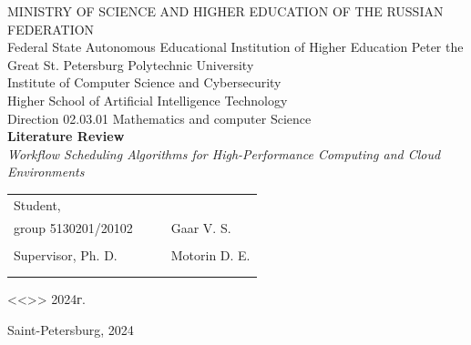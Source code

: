 \documentclass[a4paper, final]{article}
\begin{document}
\setcounter{tocdepth}{2} %
\begin{center}
    \hfill \break
    \hfill \break
    \normalsize{MINISTRY OF SCIENCE AND HIGHER EDUCATION OF THE RUSSIAN FEDERATION\\
    Federal State Autonomous Educational Institution of Higher Education Peter the Great St. Petersburg Polytechnic University\\[10pt]}
    \normalsize{Institute of Computer Science and Cybersecurity}\\[10pt] 
    \normalsize{Higher School of Artificial Intelligence Technology}\\[10pt] 
    \normalsize{Direction 02.03.01 Mathematics and computer Science}\\
    
    \hfill \break
    \hfill \break
    \hfill \break
    \hfill \break
    \large{\textbf{Literature Review}}\\
    \large{\textit{Workflow Scheduling Algorithms for High-Performance Computing and Cloud Environments}}\\
    
    \hfill \break
    \hfill \break
\end{center}

\small{ 
    \begin{tabular}{lrrl}
        \!\!\!Student, & \hspace{2cm} & & \\
        \!\!\!group 5130201/20102 & \hspace{2cm} & \underline{\hspace{3cm}} & Gaar V. S. \\\\
        \!\!\!Supervisor, Ph. D. & \hspace{2cm} &  \underline{\hspace{3cm}} &  Motorin D. E. \\\\
        &&\hspace{4cm}
    \end{tabular}
    \begin{flushright}
        <<\underline{\hspace{1cm}}>>\underline{\hspace{2.5cm}} 2024г.
    \end{flushright}
}

\hfill \break
\begin{center} \small{Saint-Petersburg, 2024} \end{center}
\thispagestyle{empty} %
\end{document}
